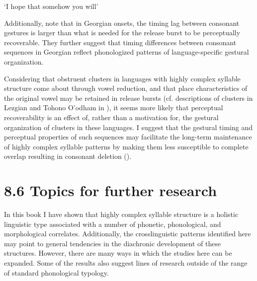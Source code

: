 ‘I hope that somehow you will’



\citep[47]{Crawford1966}
\z



Additionally, \citet{ChitoranCohn2009} note that in Georgian onsets, the timing lag between consonant gestures is larger than what is needed for the release burst to be perceptually recoverable. They further suggest that timing differences between consonant sequences in Georgian reflect phonologized patterns of language-specific gestural organization.



  Considering that obstruent clusters in languages with highly complex syllable structure come about through vowel reduction, and that place characteristics of the original vowel may be retained in release bursts (cf. descriptions of clusters in Lezgian and Tohono O’odham in ), it seems more likely that perceptual recoverability is an effect of, rather than a motivation for, the gestural organization of clusters in these languages. I suggest that the gestural timing and perceptual properties of such sequences may facilitate the long-term maintenance of highly complex syllable patterns by making them less susceptible to complete overlap resulting in consonant deletion (\citealt{BrowmanGoldstein1990}).


\section{8.6 Topics for further research}

  In this book I have shown that highly complex syllable structure is a holistic linguistic type associated with a number of phonetic, phonological, and morphological correlates. Additionally, the crosslinguistic patterns identified here may point to general tendencies in the diachronic development of these structures. However, there are many ways in which the studies here can be expanded. Some of the results also suggest lines of research outside of the range of standard phonological typology.



